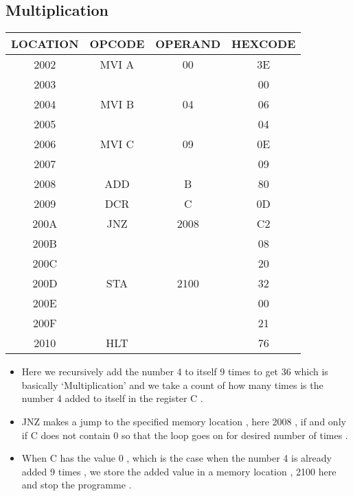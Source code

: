 \documentclass[14pt]{article}
\begin{document}
\subsection{Multiplication}
\begin{center}
\vspace{3em}
\begin{tabular}{ |c|c|c|c| }
	\hline
	\textbf{LOCATION} & \textbf{OPCODE} & \textbf{OPERAND} & \textbf{HEXCODE} \\
	\hline
	2002 & MVI A & 00 & 3E \\
	\hline
	2003 &  &  & 00 \\
	\hline
	2004 & MVI B & 04 & 06 \\
	\hline
	2005 &  &  & 04 \\
	\hline
	2006 & MVI C & 09 & 0E \\
	\hline
	2007 &  &  & 09 \\
	\hline
	2008 & ADD & B & 80 \\
	\hline
	2009 & DCR & C & 0D \\
	\hline
	200A & JNZ & 2008 & C2 \\
	\hline
	200B &  &  & 08 \\
	\hline
	200C &  &  & 20 \\
	\hline
	200D & STA & 2100 & 32 \\
	\hline
	200E &  &  & 00 \\
	\hline
	200F &  &  & 21 \\
	\hline
	2010 & HLT &  & 76 \\
	\hline
\end{tabular}
\end{center}
\vspace{3em}
\begin{itemize}
	\item{Here we recursively add the number 4 to itself 9 times to get 36 which is basically `Multiplication' and we take a count of how many times is the number 4 added to itself in the register C .}
	\item{JNZ makes a jump to the specified memory location , here 2008 , if and only if C does not contain 0 so that the loop goes on for desired number of times .}
	\item{When C has the value 0 , which is the case when the number 4 is already added 9 times , we store the added value in a memory location , 2100 here and stop the programme .}
\end{itemize}
\end{document}
